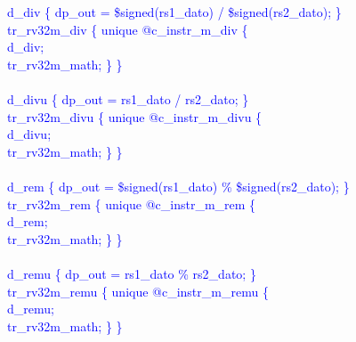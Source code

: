 \textcolor{blue}{
\indent d\_div \{ dp\_out = \$signed(rs1\_dato) / \$signed(rs2\_dato); \}\\%
\indent tr\_rv32m\_div \{ unique @c\_instr\_m\_div \{ \\%
\indent \hspace{\parindent} d\_div; \\%
\indent \hspace{\parindent} tr\_rv32m\_math; \} \} \\%
\\
\indent d\_divu \{ dp\_out = rs1\_dato / rs2\_dato; \}\\%
\indent tr\_rv32m\_divu \{ unique @c\_instr\_m\_divu \{ \\%
\indent \hspace{\parindent} d\_divu; \\%
\indent \hspace{\parindent} tr\_rv32m\_math; \} \} \\%
\\
\indent d\_rem \{ dp\_out = \$signed(rs1\_dato) \% \$signed(rs2\_dato); \}\\%
\indent tr\_rv32m\_rem \{ unique @c\_instr\_m\_rem \{ \\%
\indent \hspace{\parindent} d\_rem; \\%
\indent \hspace{\parindent} tr\_rv32m\_math; \} \} \\%
\\
\indent d\_remu \{ dp\_out = rs1\_dato \% rs2\_dato; \}\\%
\indent tr\_rv32m\_remu \{ unique @c\_instr\_m\_remu \{ \\%
\indent \hspace{\parindent} d\_remu; \\%
\indent \hspace{\parindent} tr\_rv32m\_math; \} \} \\%
}

